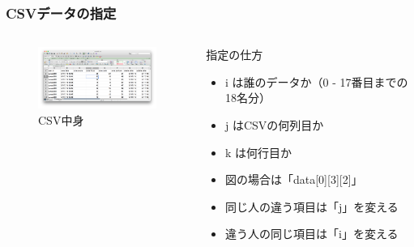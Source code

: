 \documentclass[10pt, dvipdfmx]{beamer}
\begin{document}
        \begin{frame}
            \frametitle{CSVデータの指定}
            \begin{columns}[c]
                \begin{column}{0.50\textwidth}
                    \begin{figure}[htb]
                        \includegraphics[width=50mm]{images/13.png}
                        \caption{CSV中身}
                        \label{fig:13}
                    \end{figure}
                \end{column}
                \begin{column}{0.50\textwidth}
                    \begin{block}{指定の仕方}
                        \begin{itemize}
                            \tiny
                            \item i は誰のデータか（0 - 17番目までの18名分）
                            \item j はCSVの何列目か
                            \item k は何行目か
                            \item 図の場合は「data[0][3][2]」
                            \item 同じ人の違う項目は「j」を変える
                            \item 違う人の同じ項目は「i」を変える
                        \end{itemize}
                    \end{block}
                \end{column}
            \end{columns}
        \end{frame}
\end{document}
